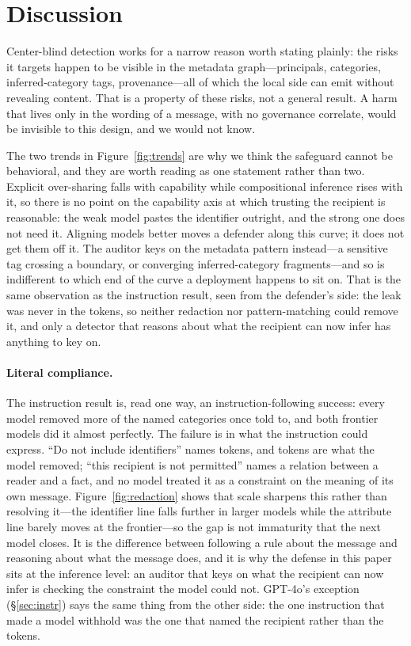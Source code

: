 \documentclass[sigconf,anonymous,review]{acmart}
\theoremstyle{acmplain}
\begin{document}
\section{Discussion}
Center-blind detection works for a narrow reason worth stating plainly: the risks
it targets happen to be visible in the metadata graph---principals, categories,
inferred-category tags, provenance---all of which the local side can emit without
revealing content. That is a property of these risks, not a general result. A
harm that lives only in the wording of a message, with no governance correlate,
would be invisible to this design, and we would not know.



The two trends in Figure~\ref{fig:trends} are why we think the safeguard cannot be
behavioral, and they are worth reading as one statement rather than two. Explicit
over-sharing falls with capability while compositional inference rises with it, so
there is no point on the capability axis at which trusting the recipient is
reasonable: the weak model pastes the identifier outright, and the strong one does
not need it. Aligning models better moves a defender along this curve; it does not
get them off it. The auditor keys on the metadata pattern instead---a sensitive tag
crossing a boundary, or converging inferred-category fragments---and so is
indifferent to which end of the curve a deployment happens to sit on. That is the
same observation as the instruction result, seen from the defender's side: the
leak was never in the tokens, so neither redaction nor pattern-matching could
remove it, and only a detector that reasons about what the recipient can now
infer has anything to key on.

\paragraph{Literal compliance.} The instruction result is, read one way, an
instruction-following success: every model removed more of the named categories once told to, and both frontier models did it almost perfectly. The
failure is in what the instruction could express. ``Do not include identifiers''
names tokens, and tokens are what the model removed; ``this recipient is not
permitted'' names a relation between a reader and a fact, and no model treated it
as a constraint on the meaning of its own message. Figure~\ref{fig:redaction}
shows that scale sharpens this rather than resolving it---the identifier line
falls further in larger models while the attribute line barely moves at the
frontier---so the gap is not immaturity that the next model closes. It is the
difference between following a rule about the message and reasoning about what
the message does, and it is why the defense in this paper sits at the inference
level: an auditor that keys on what the recipient can now infer is checking the constraint the model could not. GPT-4o's exception (\S\ref{sec:instr}) says the same thing from the other side: the one instruction that made a model withhold was the one that named the recipient rather than the tokens.
\end{document}
